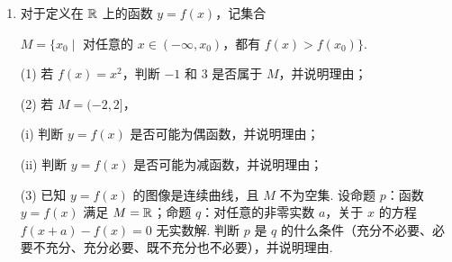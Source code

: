 \documentclass[a4paper,11pt]{article}
\begin{document}
\begin{enumerate}
\solend
\fi

\item 对于定义在 $\mathbb{R}$ 上的函数 $y=f(x)$，记集合

$M=\{x_0\mid$ 对任意的 $x\in(-\infty,x_0)$，都有 $f(x)>f(x_0)\}$.

(1) 若 $f(x)=x^2$，判断 $-1$ 和 $3$ 是否属于 $M$，并说明理由；

(2) 若 $M=(-2,2]$，

(i) 判断 $y=f(x)$ 是否可能为偶函数，并说明理由；

(ii) 判断 $y=f(x)$ 是否可能为减函数，并说明理由；

(3) 已知 $y=f(x)$ 的图像是连续曲线，且 $M$ 不为空集. 设命题 $p$：函数 $y=f(x)$ 满足 $M=\mathbb{R}$；命题 $q$：对任意的非零实数 $a$，关于 $x$ 的方程 $f(x+a)-f(x)=0$ 无实数解. 判断 $p$ 是 $q$ 的什么条件（充分不必要、必要不充分、充分必要、既不充分也不必要），并说明理由.


\end{enumerate}
\end{document}
